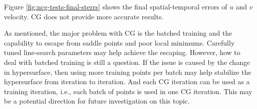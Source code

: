 Figure \ref{fig:ncg-tests-final-sterrs} shows the final spatial-temporal errors of $u$ and $v$ velocity.
CG does not provide more accurate results.

As mentioned, the major problem with CG is the batched training and the capability to escape from saddle points and poor local minimums.
Carefully tuned line-search parameters may help achieve the escaping.
However, how to deal with batched training is still a question.
If the issue is caused by the change in hypersurface, then using more training points per batch may help stabilize the hypersurface from iteration to iteration.
And each CG iteration can be used as a training iteration, i.e., each batch of points is used in one CG iteration.
This may be a potential direction for future investigation on this topic.
